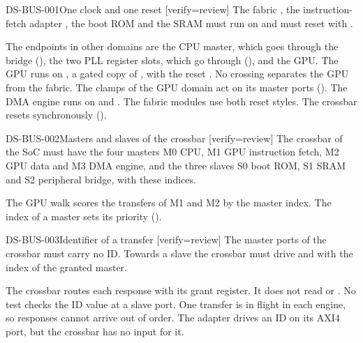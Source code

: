 \begin{requirement}{DS-BUS-001}{One clock and one reset}
[verify={review}]
The fabric , the instruction-fetch adapter , the boot ROM  and the SRAM  must run on  and must reset with .
\end{requirement}
\begin{information}
The endpoints in other domains are the CPU master, which goes through the bridge  (), the two PLL register slots, which go through  (), and the GPU. The GPU runs on , a gated copy of , with the reset . No crossing separates the GPU from the fabric. The clamps of the GPU domain act on its master ports (). The DMA engine runs on  and . The fabric modules use both reset styles. The crossbar resets synchronously ().
\end{information}

\begin{requirement}{DS-BUS-002}{Masters and slaves of the crossbar}
[verify={review}]
The crossbar of the SoC must have the four masters M0 CPU, M1 GPU instruction fetch, M2 GPU data and M3 DMA engine, and the three slaves S0 boot ROM, S1 SRAM and S2 peripheral bridge, with these indices.
\end{requirement}
\begin{information}
The GPU walk scores the transfers of M1 and M2 by the master index. The index of a master sets its priority ().
\end{information}

\begin{requirement}{DS-BUS-003}{Identifier of a transfer}
[verify={review}]
The master ports of the crossbar must carry no ID. Towards a slave the crossbar must drive  and  with the index of the granted master.
\end{requirement}
\begin{information}
The crossbar routes each response with its grant register. It does not read  or . No test checks the ID value at a slave port. One transfer is in flight in each engine, so responses cannot arrive out of order. The adapter  drives an ID on its AXI4 port, but the crossbar has no input for it.
\end{information}

